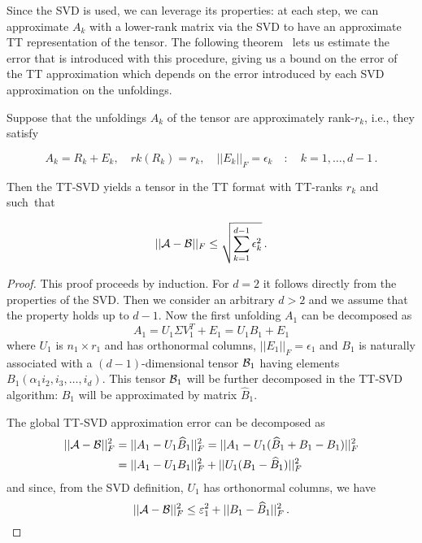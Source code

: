 Since the SVD is used, we can leverage its properties: at each step, we can approximate $A_k$ with a lower-rank matrix via the SVD to have an approximate TT representation of the tensor. The following theorem~\cite{oseledets2011tt} lets us estimate the error that is introduced with this procedure, giving us a bound on the error of the TT approximation which depends on the error introduced by each SVD approximation on the unfoldings.

\begin{Teo} \label{teo:ttsvd_approx}
  Suppose that the unfoldings $A_k$ of the tensor \A are approximately rank-$r_k$, i.e., they satisfy

  \begin{equation} \label{teo:ttsvd_approx:ip:1}
  A_k = R_k + E_k, \quad rk(R_k) = r_k, \quad ||E_k||_F = \epsilon_k \quad:\quad k = 1,\ldots,d-1\, .
  \end{equation}

  Then the TT-SVD yields a tensor \B in the TT format with TT-ranks $r_k$ and such~that

  \begin{equation*}
    ||\mathcal{A} - \mathcal{B} ||_F \le \sqrt{\sum_{k=1}^{d-1} \epsilon_k^2}\, .
  \end{equation*}
  
  \begin{proof}
    This proof proceeds by induction. For $d=2$ it follows directly from the properties of the SVD. Then we consider an arbitrary $d > 2$ and we assume that the property holds up to $d - 1$.  Now the first unfolding $A_1$ can be decomposed as
    \begin{equation*}
    A_1 = U_1 \Sigma V_1^T + E_1 = U_1 B_1 + E_1
    \end{equation*}
    where $U_1$ is $n_1 \times r_1$ and has orthonormal columns, $||E_1||_F = \epsilon_1$ and $B_1$ is naturally associated with a $(d-1)$-dimensional tensor $\mathcal{B}_1$ having elements $B_1(\alpha_1i_2,i_3,\ldots,i_d)$. This tensor $\mathcal{B}_1$ will be further decomposed in the TT-SVD algorithm: $B_1$ will be approximated by matrix $\hat{B}_1$.

    The global TT-SVD approximation error can be decomposed as
    \begin{equation*}
      \begin{split}
        ||\mathcal{A}-\mathcal{B}||_F^2 &= ||A_1 - U_1\widehat{B}_1||_F^2 = ||A_1 - U_1(\widehat{B}_1 + B_1 - B_1)||_F^2 \\
         &= ||A_1 - U_1 B_1||_F^2 + ||U_1(B_1 - \widehat{B}_1)||_F^2
      \end{split}
    \end{equation*}
    and since, from the SVD definition, $U_1$ has orthonormal columns, we have
    \begin{equation} \label{teo:ttsvd_approx:proof:bound}
      ||\mathcal{A} - \mathcal{B}||_F^2 \le \varepsilon_1^2 + ||B_1 - \widehat{B}_1 ||_F^2\, .
    \end{equation}


\end{proof}
\end{Teo}
